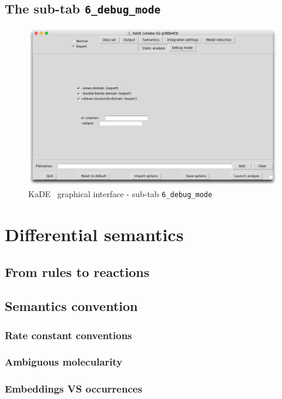 \documentclass[11pt]{book}
\def\KaDE{\textsf{KaDE}}
\begin{document}
\subsection{The sub-tab \texttt{6\_debug\_mode}}

\begin{figure}[htbp]
\centering
\includegraphics[width=12cm,bb=0 0 1904 1208]{img/kade_5.png}
\caption{\KaDE~ graphical interface - sub-tab \texttt{6\_debug\_mode}}
\label{fig:kade:6}
\end{figure}

\section{Differential semantics}
\label{sec:differential semantics}

\subsection{From rules to reactions}
\subsection{Semantics convention}

\subsubsection{Rate constant conventions}
\subsubsection{Ambiguous molecularity}
\subsubsection{Embeddings VS occurrences}
\end{document}
